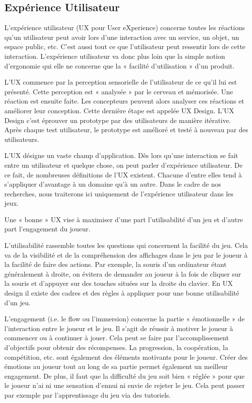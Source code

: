 \documentclass{article}
\begin{document}
	\subsection{Expérience Utilisateur}\label{sec:UX}
		L’expérience utilisateur (UX pour User eXperience) concerne toutes les réactions qu’un utilisateur peut avoir lors d’une interaction avec un service, un objet, un espace public, etc.
		C’est aussi tout ce que l’utilisateur peut ressentir lors de cette interaction.
		L’expérience utilisateur va donc plus loin que la simple notion d’ergonomie qui elle ne concerne que la « facilité d’utilisation » d’un produit.\par
		L’UX commence par la perception sensorielle de l’utilisateur de ce qu’il lui est présenté. 
		Cette perception est « analysée » par le cerveau et mémorisée.
		Une réaction est ensuite faite.
		Les concepteurs peuvent alors analyser ces réactions et améliorer leur conception.
		Cette dernière étape est appelée UX Design.
		L’UX Design c’est éprouver un prototype par des utilisateurs de manière itérative.
		Après chaque test utilisateur, le prototype est amélioré et testé à nouveau par des utilisateurs.\par
		L’UX désigne un vaste champ d’application.
		Dès lors qu’une interaction se fait entre un utilisateur et quelque chose, on peut parler d’expérience utilisateur.
		De ce fait, de nombreuses définitions de l’UX existent.
		Chacune d’entre elles tend à s’appliquer d’avantage à un domaine qu’à un autre.
		Dans le cadre de nos recherches, nous traiterons ici uniquement de l’expérience utilisateur dans les jeux.\par
		Une « bonne » UX vise à maximiser d’une part l’utilisabilité d’un jeu et d’autre part l’engagement du joueur.\par
		L’utilisabilité rassemble toutes les questions qui concernent la facilité du jeu.
		Cela va de la visibilité et de la compréhension des affichages dans le jeu par le joueur à la facilité de faire des actions.
		Par exemple, la souris d’un ordinateur étant généralement à droite, on évitera de demander au joueur à la fois de cliquer sur la souris et d’appuyer sur des touches situées sur la droite du clavier.
		En UX design il existe des cadres et des règles à appliquer pour une bonne utilisabilité d’un jeu.\par
		L’engagement (i.e. le flow ou l’immersion) concerne la partie « émotionnelle » de l’interaction entre le joueur et le jeu.
		Il s’agit de réussir à motiver le joueur à commencer ou à continuer à jouer.
		Cela peut se faire par l’accomplissement d’objectifs pour obtenir des récompenses.
		La progression, la coopération, la compétition, etc. sont également des éléments motivants pour le joueur.
		Créer des émotions au joueur tout au long de sa partie permet également un meilleur engagement.
		De plus, il faut que la difficulté du jeu soit bien « réglée » pour que le joueur n’ai ni une sensation d’ennui ni envie de rejeter le jeu.
		Cela peut passer par exemple par l’apprentissage du jeu via des tutoriels.
\end{document}
